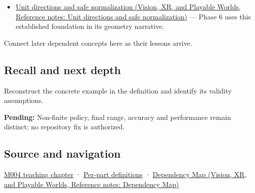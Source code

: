 \hypertarget{appendix-7f1e17dcafb1-used-by}{}

\begin{itemize}
\tightlist
\item
  \href{../07-Vision-XR-and-Playable-Worlds/main.pdf\#nameddest=appendix-f744e41b95b4}{Unit directions and safe normalization (Vision, XR, and Playable Worlds, Reference notes: Unit directions and safe normalization)} --- Phase 6 uses this established foundation in its geometry narrative.
\end{itemize}

Connect later dependent concepts here as their lessons arrive.

\subsection{Recall and next depth}\label{appendix-7f1e17dcafb1-recall-and-next-depth}

\hypertarget{appendix-7f1e17dcafb1-recall-and-next-depth}{}

Reconstruct the concrete example in the definition and identify its validity assumptions.

\textbf{Pending:} Non-finite policy, final range, accuracy and performance remain distinct; no repository fix is authorized.

\subsection{Source and navigation}\label{appendix-7f1e17dcafb1-source-and-navigation}

\hypertarget{appendix-7f1e17dcafb1-source-and-navigation}{}

\hyperref[01-foundations-i-ch001-a-stretching-ruler-for-real-valued-quantities]{M004 teaching chapter} · \hyperref[appendix-fd090d982a15-m004---parts-61-76]{Per-part definitions} · \href{../07-Vision-XR-and-Playable-Worlds/main.pdf\#nameddest=appendix-4ad47bdd269a}{Dependency Map (Vision, XR, and Playable Worlds, Reference notes: Dependency Map)}
